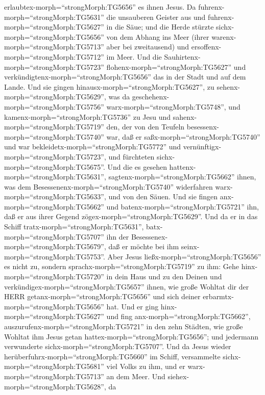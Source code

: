 erlaubtex-morph=``strongMorph:TG5656'' es ihnen Jesus. Da
fuhrenx-morph=``strongMorph:TG5631'' die unsauberen Geister aus und
fuhrenx-morph=``strongMorph:TG5627'' in die Säue; und die Herde stürzte
sichx-morph=``strongMorph:TG5656'' von dem Abhang ins Meer (ihrer
warenx-morph=``strongMorph:TG5713'' aber bei zweitausend) und
ersoffenx-morph=``strongMorph:TG5712'' im Meer.  Und die
Sauhirtenx-morph=``strongMorph:TG5723''
flohenx-morph=``strongMorph:TG5627'' und
verkündigtenx-morph=``strongMorph:TG5656'' das in der Stadt und auf dem
Lande. Und sie gingen hinausx-morph=``strongMorph:TG5627'', zu
sehenx-morph=``strongMorph:TG5629'', was da
geschehenx-morph=``strongMorph:TG5756''
warx-morph=``strongMorph:TG5748'',  und
kamenx-morph=``strongMorph:TG5736'' zu Jesu und
sahenx-morph=``strongMorph:TG5719'' den, der von den Teufeln
besessenx-morph=``strongMorph:TG5740'' war, daß er
saßx-morph=``strongMorph:TG5740'' und war
bekleidetx-morph=``strongMorph:TG5772'' und
vernünftigx-morph=``strongMorph:TG5723'', und fürchteten
sichx-morph=``strongMorph:TG5675''.  Und die es gesehen
hattenx-morph=``strongMorph:TG5631'',
sagtenx-morph=``strongMorph:TG5662'' ihnen, was dem
Besessenenx-morph=``strongMorph:TG5740'' widerfahren
warx-morph=``strongMorph:TG5633'', und von den Säuen.  Und
sie fingen anx-morph=``strongMorph:TG5662'' und
batenx-morph=``strongMorph:TG5721'' ihn, daß er aus ihrer Gegend
zögex-morph=``strongMorph:TG5629''.  Und da er in das
Schiff tratx-morph=``strongMorph:TG5631'',
batx-morph=``strongMorph:TG5707'' ihn der
Besessenex-morph=``strongMorph:TG5679'', daß er möchte bei ihm
seinx-morph=``strongMorph:TG5753''.  Aber Jesus
ließx-morph=``strongMorph:TG5656'' es nicht zu, sondern
sprachx-morph=``strongMorph:TG5719'' zu ihm: Gehe
hinx-morph=``strongMorph:TG5720'' in dein Haus und zu den Deinen und
verkündigex-morph=``strongMorph:TG5657'' ihnen, wie große Wohltat dir
der HERR getanx-morph=``strongMorph:TG5656'' und sich deiner
erbarmtx-morph=``strongMorph:TG5656'' hat.  Und er ging
hinx-morph=``strongMorph:TG5627'' und fing
anx-morph=``strongMorph:TG5662'',
auszurufenx-morph=``strongMorph:TG5721'' in den zehn Städten, wie große
Wohltat ihm Jesus getan hattex-morph=``strongMorph:TG5656''; und
jedermann verwunderte sichx-morph=``strongMorph:TG5707''. 
Und da Jesus wieder herüberfuhrx-morph=``strongMorph:TG5660'' im Schiff,
versammelte sichx-morph=``strongMorph:TG5681'' viel Volks zu ihm, und er
warx-morph=``strongMorph:TG5713'' an dem Meer.  Und
siehex-morph=``strongMorph:TG5628'', da
